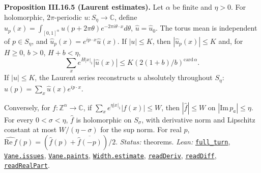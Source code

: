 \documentclass[
  letterpaper,
  11pt]{article}
\begin{document}
\textbf{Proposition III.16.5 (Laurent estimates).} Let \(\alpha\) be
finite and \(\eta>0\). For holomorphic, \(2\pi\)-periodic
\(u:S_\eta\to\mathbb C\), define
\(\hat u_p(x)=\int_{[0,1]^\alpha}u(p+2\pi\theta)e^{-2\pi i\theta\cdot x}d\theta\),
\(\hat u=\hat u_0\). The torus mean is independent of \(p\in S_\eta\),
and \(\hat u_p(x)=e^{ip\cdot x}\hat u(x)\). If \(|u|\le K\), then
\(|\hat u_p(x)|\le K\) and, for \(H\ge0\), \(b>0\), \(H+b<\eta\),
\[\sum_xe^{H|x|_1}|\hat u(x)|\le K(2(1+b)/b)^{\mathrm{card}\,\alpha}.\]
If \(|u|\le K\), the Laurent series reconstructs \(u\) absolutely
throughout \(S_\eta\): \(u(p)=\sum_x\hat u(x)e^{ip\cdot x}\).

Conversely, for \(f:\mathbb Z^\alpha\to\mathbb C\), if
\(\sum_xe^{\eta|x|_1}|f(x)|\le W\), then \(|\hat f|\le W\) on
\(|\mathrm{Im}\,p_a|\le\eta\). For every \(0<\sigma<\eta\), \(\hat f\)
is holomorphic on \(S_\sigma\), with derivative norm and Lipschitz
constant at most \(W/(\eta-\sigma)\) for the sup norm. For real \(p\),
\(\widehat{\mathrm{Re}\,f}(p)=(\hat f(p)+\overline{\hat f(-p)})/2\).
\emph{Status:} theorems. \emph{Lean:}
\href{https://github.com/yang-mills-group/OpenAI-YM-20261028/blob/3456e5e75cf8d4cd558955a5c7638fba2d68f464/YM/Laurent/Turn.lean\#L103-L112}{\texttt{full\_turn}},
\href{https://github.com/yang-mills-group/OpenAI-YM-20261028/blob/3456e5e75cf8d4cd558955a5c7638fba2d68f464/YM/Laurent/Art.lean\#L61-L87}{\texttt{Vane.issues}},
\href{https://github.com/yang-mills-group/OpenAI-YM-20261028/blob/3456e5e75cf8d4cd558955a5c7638fba2d68f464/YM/Laurent/Art.lean\#L90-L104}{\texttt{Vane.paints}},
\href{https://github.com/yang-mills-group/OpenAI-YM-20261028/blob/3456e5e75cf8d4cd558955a5c7638fba2d68f464/YM/Laurent/Eval.lean\#L131-L133}{\texttt{Width.estimate}},
\href{https://github.com/yang-mills-group/OpenAI-YM-20261028/blob/3456e5e75cf8d4cd558955a5c7638fba2d68f464/YM/Work/F07/Read.lean\#L55-L95}{\texttt{readDeriv}},
\href{https://github.com/yang-mills-group/OpenAI-YM-20261028/blob/3456e5e75cf8d4cd558955a5c7638fba2d68f464/YM/Work/F07/Read.lean\#L97-L101}{\texttt{readDiff}},
\href{https://github.com/yang-mills-group/OpenAI-YM-20261028/blob/3456e5e75cf8d4cd558955a5c7638fba2d68f464/YM/Work/F07/Read.lean\#L119-L133}{\texttt{readRealPart}}.
\end{document}
